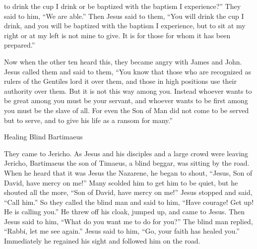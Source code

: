 {to drink
the cup
I
drink
or
be baptized
with the baptism
I
experience?”
They
said
to him,
“We are able.”
Then
Jesus
said
to them,
“You will drink
the cup
I
drink,
and
you will be baptized
with the baptism
I
experience,
but
to sit
at
my
right
or
at
my left
is
not
mine
to give.
It is for those for whom
it has been prepared.”
\par }{\PP {}Now when the other ten
heard
this, they became angry
with
James
and
John.
Jesus
called
them
and said
to them,
“You know
that
those who are recognized
as rulers
of the Gentiles
lord
it over
them,
and
those in high positions
use
their
authority over
them.
But
it is
not
this way
among
you.
Instead
whoever
wants
to be
great
among
you
must be
your
servant,
and
whoever
wants
to be
first
among
you
must be
the slave
of all.
For
even the Son
of Man
did
not
come
to be served
but
to serve,
and
to give
his
life
as a ransom
for
many.”
\par }{\SH Healing Blind Bartimaeus
\par }{\PP {}They came
to
Jericho.
As Jesus and
his
disciples
and
a
large
crowd
were leaving
Jericho,
Bartimaeus
the son
of Timaeus,
a blind beggar,
was sitting
by
the road.
When
he heard
that
it was
Jesus
the Nazarene,
he began
to shout, “Jesus,
Son
of David,
have mercy
on me!”
Many
scolded
him
to get
him to be quiet,
but
he shouted
all the more,
“Son
of David,
have mercy
on me!”
Jesus
stopped
and
said,
“Call
him.”
So
they called
the blind man
and said
to him,
“Have courage! Get up! He is calling
you.”
He threw off
his
cloak,
jumped up,
and came
to
Jesus.
Then Jesus
said
to him, “What
do
you
want
me to do
for you?” The blind man
replied,
“Rabbi,
let me see again.”
Jesus
said
to him,
“Go,
your
faith
has healed
you.”
Immediately
he regained his sight
and
followed
him
on
the road.

}
